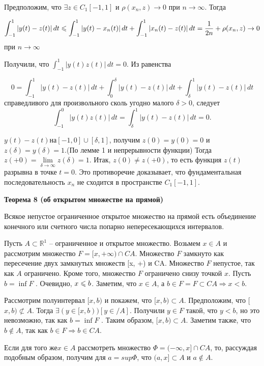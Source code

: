 Предположим, что  $\exists z \in C_1[-1, 1]$ и $\rho(x_n, z) \rightarrow 0$ при
$n \rightarrow \infty $. Тогда

$$\int_{-1}^{1} |y(t)- z(t)| \,dt \leqslant\int_{-1}^{1} |y(t)- x_n(t)|\,dt +
    \int_{-1}^{1}|x_n(t)- z(t)| \,dt=\frac{1}{2n}+\rho(x_n,z)\rightarrow 0$$ при $n \rightarrow \infty$

Получили, что	$\int_{-1}^{1}|y(t) z(t)| \,dt = 0.$ Из равенства

$$0 =\int_{-1}^{1}|y(t)- z(t)| \,dt +
    \int_{0}^\delta|y(t)- z(t)| \,dt +\int_\delta^1|y(t) -z(t)| \,dt$$
справедливого для произвольного сколь угодно малого $\delta > 0$, следует
$$\int_{-1}^0 |y(t) z(t)| \,dt =\int^{1}_\delta |y(t) -z(t)| \,dt = 0.$$

$y(t) -z(t) на [-1, 0] \cup [\delta, 1]$, получим $z(0) = y(0) = 0$ и $z(\delta)
    = y(\delta) = 1.$(По лемме 1 и непрерывности функции)
Тогда $z(+0) = \underset{\delta \to \infty }{\lim}z(\delta)= 1$. Итак, $z(0)\neq z(+0)$, то
есть функция $z(t)$ разрывна в точке $t = 0$. Это противоречие доказывает, что
фундаментальная последовательность $x_n$ не сходится в пространстве $C_1[-1, 1]$.

\noindent\dotfill
    
\textbf{Теорема 8 (об открытом множестве на прямой) }

Всякое непустое ограниченное открытое множество на прямой есть объединение
конечного или счетного числа попарно непересекающихся интервалов.

Пусть $A \subset \mathbb{R}^1$ – ограниченное и открытое множество.
Возьмем $x \in  A$ и рассмотрим множество $F = [x, +\infty ) \cap CA$.
Множество $F$ замкнуто как пересечение двух замкнутых множеств [x, +\infty ) и CA.
Множество $F$ непустое, так как $A$ ограничено. Кроме того, множество $F$
ограничено снизу точкой $x$. Пусть $b = \inf F$ . Очевидно, $x \leqslant  b$.
Заметим, что $x \in  A$, а $b \in  F = F \subset CA \Rightarrow x < b$.

Рассмотрим полуинтервал $[x, b)$ и покажем, что [$x, b) \subset
    A$. Предположим, что [$x, b) \not\subset A$.
Тогда $\exists(y  \in  [x, b)) [ y  \in /  A]$. Получили $y  \in  F$
такой, что $y  < b$,
но это невозможно, так как $b = \inf F$ . Таким образом, $[x, b) \subset A$. Заметим также,
                что $b \notin  A$, так как $b \in  F \Rightarrow b \in  CA$.

                Если для того же$ x \in  A$ рассмотреть множество $\Phi = (-\infty , x] \cap CA$, то,
рассуждая подобным образом, получим для $a = sup \Phi$,
что $(a, x] \subset A$ и $a \notin  A$.

